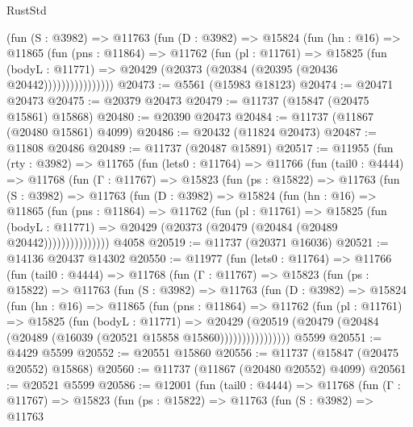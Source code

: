 \begin{lexlean}{RustStd}
\begin{coremodule}
                (fun (S : @3982) =>
                @11763
                  (fun (D : @3982) =>
                  @15824
                    (fun (hn : @16) =>
                    @11865
                      (fun (pns : @11864) =>
                      @11762
                        (fun (pl : @11761) =>
                        @15825
                          (fun (bodyL : @11771) =>
                          @20429 (@20373 (@20384 (@20395 (@20436 @20442))))))))))))))))
@20473 := @5561 (@15983 @18123)
@20474 := @20471 @20473
@20475 := @20379 @20473
@20479 := @11737 (@15847 (@20475 @15861) @15868)
@20480 := @20390 @20473
@20484 := @11737 (@11867 (@20480 @15861) @4099)
@20486 := @20432 (@11824 @20473)
@20487 := @11808 @20486
@20489 := @11737 (@20487 @15891)
@20517 := @11955
    (fun (rty : @3982) =>
    @11765
      (fun (lets0 : @11764) =>
      @11766
        (fun (tail0 : @4444) =>
        @11768
          (fun (Γ : @11767) =>
          @15823
            (fun (ps : @15822) =>
            @11763
              (fun (S : @3982) =>
              @11763
                (fun (D : @3982) =>
                @15824
                  (fun (hn : @16) =>
                  @11865
                    (fun (pns : @11864) =>
                    @11762
                      (fun (pl : @11761) =>
                      @15825
                        (fun (bodyL : @11771) =>
                        @20429 (@20373 (@20479 (@20484 (@20489 @20442)))))))))))))))
    @4058
@20519 := @11737 (@20371 @16036)
@20521 := @14136 @20437 @14302
@20550 := @11977
    (fun (lets0 : @11764) =>
    @11766
      (fun (tail0 : @4444) =>
      @11768
        (fun (Γ : @11767) =>
        @15823
          (fun (ps : @15822) =>
          @11763
            (fun (S : @3982) =>
            @11763
              (fun (D : @3982) =>
              @15824
                (fun (hn : @16) =>
                @11865
                  (fun (pns : @11864) =>
                  @11762
                    (fun (pl : @11761) =>
                    @15825
                      (fun (bodyL : @11771) =>
                      @20429
                        (@20519
                          (@20479 (@20484 (@20489 (@16039 (@20521 @15858 @15860))))))))))))))))
    @5599
@20551 := @4429 @5599
@20552 := @20551 @15860
@20556 := @11737 (@15847 (@20475 @20552) @15868)
@20560 := @11737 (@11867 (@20480 @20552) @4099)
@20561 := @20521 @5599
@20586 := @12001
    (fun (tail0 : @4444) =>
    @11768
      (fun (Γ : @11767) =>
      @15823
        (fun (ps : @15822) =>
        @11763
          (fun (S : @3982) =>
          @11763

\end{coremodule}
\end{lexlean}
